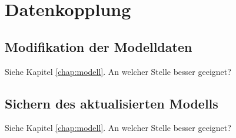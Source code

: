 \chapter{Datenkopplung}
\section{Modifikation der Modelldaten}
Siehe Kapitel \ref{chap:modell}. An welcher Stelle besser geeignet?

\section{Sichern des aktualisierten Modells}
Siehe Kapitel \ref{chap:modell}. An welcher Stelle besser geeignet?
